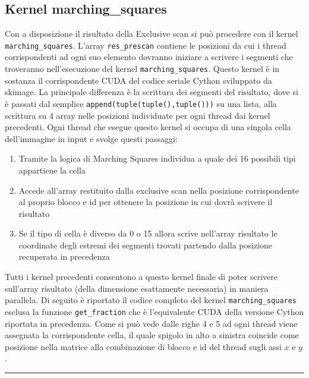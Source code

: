 \documentclass[12pt,a4paper]{report}
\begin{document}
\subsection{Kernel marching\_squares}
Con a disposizione il risultato della Exclusive scan si può procedere con il kernel \verb|marching_squares|. \newline
L'array \verb|res_prescan| contiene le posizioni da cui i thread corrispondenti ad ogni suo elemento dovranno iniziare a scrivere i segmenti che troveranno nell'esecuzione del kernel \verb|marching_squares|. 
Questo kernel è in sostanza il corrispondente CUDA del codice seriale Cython sviluppato da skimage. La principale differenza è la scrittura dei segmenti del risultato, dove si è passati dal semplice \verb|append(tuple(tuple(),tuple()))| su una lista, alla scrittura su 4 array nelle posizioni individuate per ogni thread dai kernel precedenti. \newline
Ogni thread che esegue questo kernel si occupa di una singola cella dell'immagine in input e svolge questi passaggi:
\begin{enumerate}
\item Tramite la logica di Marching Squares individua a quale dei 16 possibili tipi appartiene la cella
\item Accede all'array restituito dalla exclusive scan nella posizione corrispondente al proprio blocco e id per ottenere la posizione in cui dovrà scrivere il risultato
\item Se il tipo di cella è diverso da 0 o 15 allora scrive nell'array risultato le coordinate degli estremi dei segmenti trovati partendo dalla posizione recuperata in precedenza
\end{enumerate}
Tutti i kernel precedenti consentono a questo kernel finale di poter scrivere sull'array risultato (della dimensione esattamente necessaria) in maniera parallela. \newline
Di seguito è riportato il codice completo del kernel \verb|marching_squares| esclusa la funzione \verb|get_fraction| che è l'equivalente CUDA della versione Cython riportata in precedenza. \newline
Come si può vede dalle righe 4 e 5 ad ogni thread viene assegnata la corrispondente cella, il quale spigolo in alto a sinistra coincide come posizione nella matrice alla combinazione di blocco e id del thread sugli assi $x$ e $y$.
\newpage
\noindent\rule[0.5ex]{\linewidth}{2pt}
\end{document}
